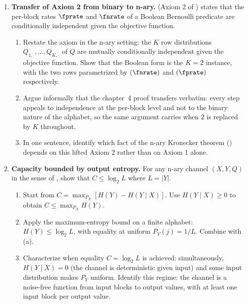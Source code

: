 \begin{enumerate}
\item \exstarstarstar
\label{ex:ch9-9}
\textbf{Transfer of Axiom 2 from binary to n-ary.}
 (Axiom 2 of )
states that the per-block rates $\fprate$ and $\fnrate$ of a
Boolean Bernoulli predicate are conditionally independent given
the objective function.
\begin{enumerate}
  \item[(a)] Restate the axiom in the n-ary setting: the $K$ row
    distributions $Q_{1, \cdot}, \ldots, Q_{K, \cdot}$ of $Q$
    are mutually conditionally independent given the objective
    function. Show that the Boolean form is the $K = 2$ instance,
    with the two rows parametrized by $(\fnrate)$ and
    $(\fprate)$ respectively.
  \item[(b)] Argue informally that the chapter~4 proof transfers
    verbatim: every step appeals to independence at the per-block
    level and not to the binary nature of the alphabet, so the
    same argument carries when $2$ is replaced by $K$ throughout.
  \item[(c)] In one sentence, identify which fact of the n-ary
    Kronecker theorem () depends on
    this lifted Axiom 2 rather than on Axiom 1 alone.
\end{enumerate}

\item \exstarstarstar
\label{ex:ch9-10}
\textbf{Capacity bounded by output entropy.}
For any n-ary channel $(X, Y, Q)$ in the sense of
, show that $C \le \log_2 L$ where $L =
|Y|$.
\begin{enumerate}
  \item[(a)] Start from $C = \max_{P_X} [H(Y) - H(Y \mid X)]$.
    Use $H(Y \mid X) \ge 0$ to obtain $C \le \max_{P_X} H(Y)$.
  \item[(b)] Apply the maximum-entropy bound on a finite alphabet:
    $H(Y) \le \log_2 L$, with equality at uniform $P_Y(j) = 1/L$.
    Combine with (a).
  \item[(c)] Characterize when equality $C = \log_2 L$ is
    achieved: simultaneously, $H(Y \mid X) = 0$ (the channel is
    deterministic given input) and some input distribution makes
    $P_Y$ uniform. Identify this regime: the channel is a
    noise-free function from input blocks to output values, with
    at least one input block per output value.
\end{enumerate}


\end{enumerate}
